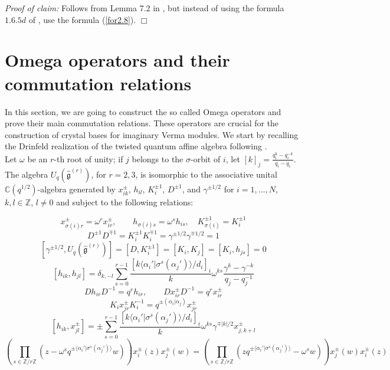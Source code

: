 \documentclass[12pt]{amsart}
\numberwithin{equation}{section}
\newcommand{\findem }{\hfill $\Box$ \vskip0.5cm }
\newcommand{\Z}{\ensuremath{\mathbb{Z}}}
\newcommand{\C}{\ensuremath{\mathbb{C}}}
\newcommand{\g}{\ensuremath{\mathfrak{g}}}
\begin{document}
{\it Proof of claim:} Follows from Lemma 7.2 in \cite{FGM}, but instead of using the formula $1.6.5d$ of \cite{BK}, use the formula (\ref{for2.8}).
\findem 

\section{Omega operators and their commutation relations}

In this section, we are going to construct the so called Omega operators and prove their main commutation relations. These operators are crucial for the construction of crystal bases for imaginary Verma modules. We start by recalling the Drinfeld realization of the twisted quantum affine algebra following \cite{D01, JM, J}.\\

Let $\omega$ be an $r$-th root of unity; if $j$ belongs to the $\sigma$-orbit of $i$, let $[k]_j = \frac{q_i^k - q_i^{-k}}{q_i - q_i}$. The algebra $U_q(\hat{\g}^{(r)})$, for $r=2,3$, is isomorphic to the associative unital $\C(q^{1/2})$-algebra generated by $x_{ik}^{\pm }$, $h_{il}$, $K_i^{\pm 1}$, $D^{\pm 1}$, and $\gamma^{\pm 1/2}$ for $i = 1, \ldots, N$, $k,l\in \Z$, $l\neq 0$ and subject  to the following relations: 

$$ x_{\sigma(i)r}^{\pm } = \omega^rx_{ir}^{\pm }, \quad \quad h_{\sigma(i)s} = \omega^sh_{is}, \quad K_{\sigma(i)}^{\pm 1} =  K_i^{\pm 1} $$
$$ D^{\pm 1}D^{\mp 1}  = K_i^{\pm 1}K_i^{\mp 1} = \gamma^{\pm 1/2}\gamma^{\mp 1/2} = 1  $$  
$$ [\gamma^{\pm 1/2}, U_q(\hat{\g}^{(r)})] = [D,K_i^{\pm 1}] = [K_i, K_j] = [K_i, h_{js}] = 0    $$
$$ [h_{ik}, h_{jl}] = \delta_{k,-l}\sum_{s=0}^{r-1} \frac{[k \langle \alpha_i' | \sigma^s(\alpha_j') \rangle/d_i]_i}{k}\omega^{ks}\frac{\gamma^k - \gamma^{-k}}{q_j - q_j^{-1}} $$
$$ Dh_{ir}D^{-1} = q^rh_{ir}, \quad \quad  Dx_{ir}^{\pm}D^{-1} = q^rx_{ir}^{\pm}$$
$$ K_ix_{jr}^{\pm}K_i^{-1} = q^{\pm (\alpha_i | \alpha_j )}x_{jr}^{\pm} $$
\begin{equation}\label{comm_h_x_currentform} [h_{ik}, x_{jl}^{\pm}] = \pm \sum_{s=0}^{r-1} \frac{[k \langle \alpha_i' | \sigma^s(\alpha_j') \rangle/d_i]_i}{k}\omega^{ks}\gamma^{\mp |k|/2}x_{j,k+l}^{\pm}  
\end{equation}
\begin{equation}\label{comx_ix_j_currentform} 
(\prod_{s\in \Z/r\Z} (z-\omega^s q^{\pm \langle \alpha_i' | \sigma^s(\alpha_j') \rangle}w))x_{i}^{\pm }(z)x_{j}^{\pm }(w) =  (\prod_{s\in \Z/r\Z} (zq^{\pm \langle \alpha_i' | \sigma^s(\alpha_j') \rangle}- \omega^sw))x_{j}^{\pm }(w)x_{i}^{\pm }(z)
\end{equation}
\end{document}
